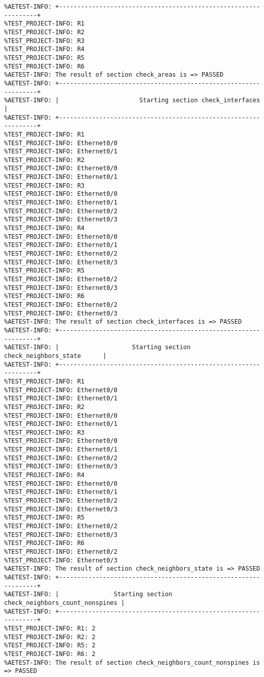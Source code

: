 \begin{verbatim}
%AETEST-INFO: +----------------------------------------------------------------+
%TEST_PROJECT-INFO: R1
%TEST_PROJECT-INFO: R2
%TEST_PROJECT-INFO: R3
%TEST_PROJECT-INFO: R4
%TEST_PROJECT-INFO: R5
%TEST_PROJECT-INFO: R6
%AETEST-INFO: The result of section check_areas is => PASSED
%AETEST-INFO: +----------------------------------------------------------------+
%AETEST-INFO: |                      Starting section check_interfaces         |
%AETEST-INFO: +----------------------------------------------------------------+
%TEST_PROJECT-INFO: R1
%TEST_PROJECT-INFO: Ethernet0/0
%TEST_PROJECT-INFO: Ethernet0/1
%TEST_PROJECT-INFO: R2
%TEST_PROJECT-INFO: Ethernet0/0
%TEST_PROJECT-INFO: Ethernet0/1
%TEST_PROJECT-INFO: R3
%TEST_PROJECT-INFO: Ethernet0/0
%TEST_PROJECT-INFO: Ethernet0/1
%TEST_PROJECT-INFO: Ethernet0/2
%TEST_PROJECT-INFO: Ethernet0/3
%TEST_PROJECT-INFO: R4
%TEST_PROJECT-INFO: Ethernet0/0
%TEST_PROJECT-INFO: Ethernet0/1
%TEST_PROJECT-INFO: Ethernet0/2
%TEST_PROJECT-INFO: Ethernet0/3
%TEST_PROJECT-INFO: R5
%TEST_PROJECT-INFO: Ethernet0/2
%TEST_PROJECT-INFO: Ethernet0/3
%TEST_PROJECT-INFO: R6
%TEST_PROJECT-INFO: Ethernet0/2
%TEST_PROJECT-INFO: Ethernet0/3
%AETEST-INFO: The result of section check_interfaces is => PASSED
%AETEST-INFO: +----------------------------------------------------------------+
%AETEST-INFO: |                    Starting section check_neighbors_state      |
%AETEST-INFO: +----------------------------------------------------------------+
%TEST_PROJECT-INFO: R1
%TEST_PROJECT-INFO: Ethernet0/0
%TEST_PROJECT-INFO: Ethernet0/1
%TEST_PROJECT-INFO: R2
%TEST_PROJECT-INFO: Ethernet0/0
%TEST_PROJECT-INFO: Ethernet0/1
%TEST_PROJECT-INFO: R3
%TEST_PROJECT-INFO: Ethernet0/0
%TEST_PROJECT-INFO: Ethernet0/1
%TEST_PROJECT-INFO: Ethernet0/2
%TEST_PROJECT-INFO: Ethernet0/3
%TEST_PROJECT-INFO: R4
%TEST_PROJECT-INFO: Ethernet0/0
%TEST_PROJECT-INFO: Ethernet0/1
%TEST_PROJECT-INFO: Ethernet0/2
%TEST_PROJECT-INFO: Ethernet0/3
%TEST_PROJECT-INFO: R5
%TEST_PROJECT-INFO: Ethernet0/2
%TEST_PROJECT-INFO: Ethernet0/3
%TEST_PROJECT-INFO: R6
%TEST_PROJECT-INFO: Ethernet0/2
%TEST_PROJECT-INFO: Ethernet0/3
%AETEST-INFO: The result of section check_neighbors_state is => PASSED
%AETEST-INFO: +----------------------------------------------------------------+
%AETEST-INFO: |               Starting section check_neighbors_count_nonspines |
%AETEST-INFO: +----------------------------------------------------------------+
%TEST_PROJECT-INFO: R1: 2
%TEST_PROJECT-INFO: R2: 2
%TEST_PROJECT-INFO: R5: 2
%TEST_PROJECT-INFO: R6: 2
%AETEST-INFO: The result of section check_neighbors_count_nonspines is => PASSED

\end{verbatim}
